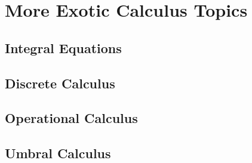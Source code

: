 \section{More Exotic Calculus Topics}

\subsection{Integral Equations}


\subsection{Discrete Calculus}




\subsection{Operational Calculus}









\subsection{Umbral Calculus}

